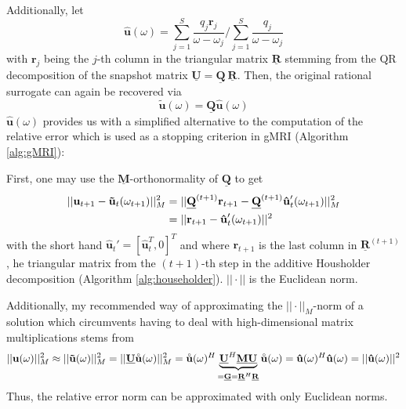 \documentclass[11pt, a4paper]{article}
\begin{document}
Additionally, let
\begin{equation}
    \mathbf{\hat{u}}(\omega) = \sum_{j=1}^S \frac{q_j \mathbf{r}_j}{\omega - \omega_j}
    / \sum_{j=1}^S \frac{q_j}{\omega - \omega_j} \label{equ:u-ring}
\end{equation}
with $\mathbf{r}_j$ being the $j$-th column in the triangular matrix
$\mathbf{\underline{R}}$ stemming from the QR decomposition of the snapshot
matrix $\mathbf{\underline{U}} = \mathbf{\underline{Q}} ~ \mathbf{\underline{R}}$.
Then, the original rational surrogate can again be recovered via
\begin{equation}
    \mathbf{\tilde{u}}(\omega) = \mathbf{\underline{Q}} \mathbf{\hat{u}}(\omega)
\end{equation}
$\mathbf{\hat{u}}(\omega)$ provides us with a simplified alternative to the
computation of the relative error which is used as a stopping criterion in
\acrshort{gMRI} (Algorithm \ref{alg:gMRI}):

First, one may use the $\mathbf{\underline{M}}$-orthonormality of $\mathbf{\underline{Q}}$
to get
\begin{align}
    ||\mathbf{u}_{t+1} - \mathbf{\tilde{u}}_{t}(\omega_{t+1})||_M^2
    &= ||\mathbf{\underline{Q}}^{(t+1)} \mathbf{r}_{t+1} - \mathbf{\underline{Q}}^{(t+1)}\mathbf{\hat{u}}_{t}'(\omega_{t+1})||_M^2 \notag \\
    &= ||\mathbf{r}_{t+1} - \mathbf{\hat{u}}_{t}'(\omega_{t+1})||^2
\end{align}
with the short hand $\mathbf{\hat{u}}_{t}' = [\mathbf{\hat{u}}_{t}^T, 0]^T$
and where $\mathbf{r}_{t+1}$ is the last column in $\mathbf{\underline{R}}^{(t+1)}$,
he triangular matrix from the $(t+1)$-th step in the additive Housholder decomposition
(Algorithm \ref{alg:householder}). $||\cdot||$ is the Euclidean norm.

Additionally, my recommended way of approximating the $||\cdot||_M$-norm
of a solution which circumvents having to deal with high-dimensional
matrix multiplications stems from
\begin{equation}
    ||\mathbf{u}(\omega)||_M^2 \approx ||\mathbf{\tilde{u}}(\omega)||_M^2
    = ||\mathbf{\underline{U}} \accentset{\circ}{\mathbf{u}}(\omega)||_M^2
    = \accentset{\circ}{\mathbf{u}}(\omega)^H \underbrace{\mathbf{\underline{U}}^H \mathbf{\underline{M}} \mathbf{\underline{U}}}_{= \mathbf{\underline{G}} = \mathbf{\underline{R}}^H \mathbf{\underline{R}}} \accentset{\circ}{\mathbf{u}}(\omega)
    = \mathbf{\hat{u}}(\omega)^H \mathbf{\hat{u}}(\omega)
    = ||\mathbf{\hat{u}}(\omega)||^2
\end{equation}
Thus, the relative error norm can be approximated with only Euclidean norms.
\end{document}
